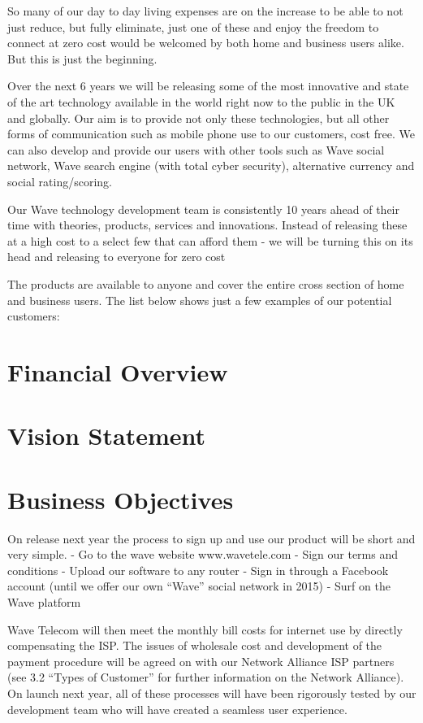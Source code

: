 \documentclass[letterpaper,10pt,openany,oneside,english]{sphinxmanual}
\begin{document}
So many of our day to day living expenses are on the increase to be able to not just reduce, but
fully eliminate, just one of these and enjoy the freedom to connect at zero cost would be
welcomed by both home and business users alike. But this is just the beginning.

Over the next 6 years we will be releasing some of the most innovative and state of the art
technology available in the world right now to the public in the UK and globally. Our aim is to
provide not only these technologies, but all other forms of communication such as mobile
phone use to our customers, cost free. We can also develop and provide our users with other
tools such as Wave social network, Wave search engine (with total cyber security), alternative
currency and social rating/scoring.

Our Wave technology development team is consistently 10 years ahead of their time with
theories, products, services and innovations. Instead of releasing these at a high cost to a select
few that can afford them - we will be turning this on its head and releasing to everyone for
zero cost

The products are available to anyone and cover the entire cross section of home and business
users. The list below shows just a few examples of our potential customers:


\section{Financial Overview}
\label{\detokenize{executive-statement:financial-overview}}

\section{Vision Statement}
\label{\detokenize{executive-statement:vision-statement}}

\section{Business Objectives}
\label{\detokenize{executive-statement:business-objectives}}
On release next year the process to sign up and use our product will be short and very simple.
- Go to the wave website www.wavetele.com
- Sign our terms and conditions
- Upload our software to any router
- Sign in through a Facebook account (until we offer our own “Wave” social network in
2015)
- Surf on the Wave platform

Wave Telecom will then meet the monthly bill costs for internet use by directly compensating
the ISP. The issues of wholesale cost and development of the payment procedure will be
agreed on with our Network Alliance ISP partners (see 3.2 “Types of Customer” for further
information on the Network Alliance).
On launch next year, all of these processes will have been rigorously tested by our
development team who will have created a seamless user experience.
\end{document}
